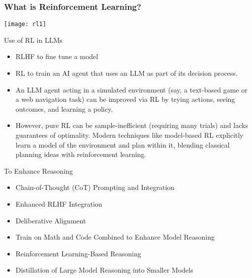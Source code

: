 \begin{frame}[fragile]\frametitle{What is Reinforcement Learning?}
		\begin{center}
		\texttt{[image: rl1]}
		\end{center}

\end{frame}


\begin{frame}[fragile]{Use of RL in LLMs}


    \begin{itemize}
        \item  RLHF to fine tune a model
		\item RL to train an AI agent that uses an LLM as part of its decision process.
		\item An LLM agent acting in a simulated environment (say, a text-based 
game or a web navigation task) can be improved via RL by trying actions, 
seeing outcomes, and learning a policy. 
		\item However, pure RL can be sample-inefficient (requiring many trials) and 
lacks guarantees of optimality. Modern techniques like model-based RL 
explicitly learn a model of the environment and plan within it, blending 
classical planning ideas with reinforcement learning.
    \end{itemize}
\end{frame}


\begin{frame}[fragile]{To Enhance Reasoning}


    \begin{itemize}
        \item  Chain-of-Thought (CoT) Prompting and Integration
        \item  Enhanced RLHF Integration
        \item  Deliberative Alignment
        \item  Train on Math and Code Combined to  Enhance Model Reasoning
        \item  Reinforcement Learning-Based Reasoning
        \item  Distillation of Large Model Reasoning into Smaller Models
    \end{itemize}
\end{frame}

